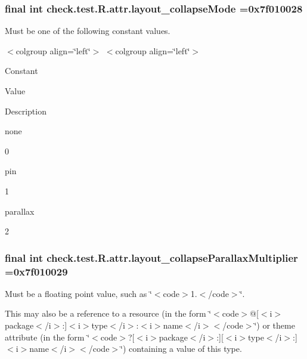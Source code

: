 \subsubsection[{layout\+\_\+collapse\+Mode}]{\setlength{\rightskip}{0pt plus 5cm}final int check.\+test.\+R.\+attr.\+layout\+\_\+collapse\+Mode =0x7f010028\hspace{0.3cm}{\ttfamily [static]}}\label{classcheck_1_1test_1_1_r_1_1attr_a88021fcc3cb9014c95731b525c8c7a13}
Must be one of the following constant values.

\begin{TabularC}{0}
\hline
\end{TabularC}
$<$colgroup align=\char`\"{}left\char`\"{}$>$ $<$colgroup align=\char`\"{}left\char`\"{}$>$ 

Constant

Value

Description 

{\ttfamily none}

0

{\ttfamily pin}

1

{\ttfamily parallax}

2\hypertarget{classcheck_1_1test_1_1_r_1_1attr_a5528272c37ed600e150a691896da50c8}{}
\subsubsection[{layout\+\_\+collapse\+Parallax\+Multiplier}]{\setlength{\rightskip}{0pt plus 5cm}final int check.\+test.\+R.\+attr.\+layout\+\_\+collapse\+Parallax\+Multiplier =0x7f010029\hspace{0.3cm}{\ttfamily [static]}}\label{classcheck_1_1test_1_1_r_1_1attr_a5528272c37ed600e150a691896da50c8}
Must be a floating point value, such as \char`\"{}$<$code$>$1.$<$/code$>$\char`\"{}. 

This may also be a reference to a resource (in the form \char`\"{}$<$code$>$@\mbox{[}$<$i$>$package$<$/i$>$\+:\mbox{]}$<$i$>$type$<$/i$>$\+:$<$i$>$name$<$/i$>$$<$/code$>$\char`\"{}) or theme attribute (in the form \char`\"{}$<$code$>$?\mbox{[}$<$i$>$package$<$/i$>$\+:\mbox{]}\mbox{[}$<$i$>$type$<$/i$>$\+:\mbox{]}$<$i$>$name$<$/i$>$$<$/code$>$\char`\"{}) containing a value of this type. \hypertarget{classcheck_1_1test_1_1_r_1_1attr_a4471bf945a7ff92386e6b03e2f974b7d}{}
